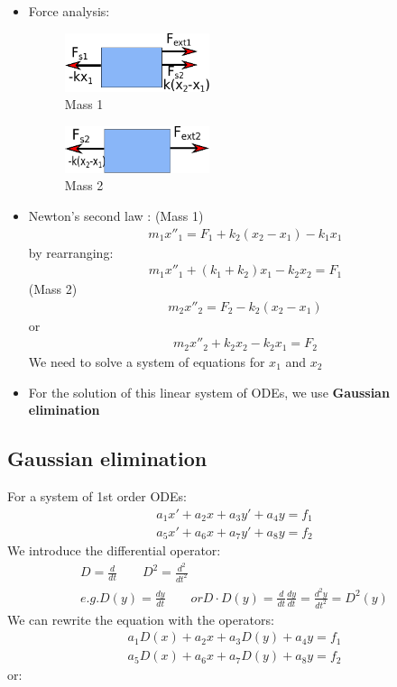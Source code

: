 \begin{itemize}
\item Force analysis:

\begin{figure}
\centering
\includegraphics[width=0.4\textwidth]{figs/massSpringDamperSystemCoupled_force1.pdf}
\caption{Mass 1}
\end{figure}
 \begin{figure}
\centering
\includegraphics[width=0.4\textwidth]{figs/massSpringDamperSystemCoupled_force2.pdf} 
\caption{Mass 2}
\end{figure}

\item Newton's second law :
(Mass 1)
 \begin{align*}
m_1x''_1  = F_1+k_2\left(x_2-x_1\right)-k_1x_1
\end{align*}
by rearranging:
 \begin{align*}
\boxed{m_1x''_1 +\left(k_1+k_2\right)x_1-k_2x_2 = F_1}
\end{align*}
(Mass 2)
 \begin{align*}
m_2x''_2  = F_2-k_2\left(x_2-x_1\right)
\end{align*}
or
\begin{align*}
\boxed{m_2x''_2 +k_2x_2- k_2x_1= F_2}
\end{align*}
We need to solve a system of equations for $x_1$ and $x_2$

\item For the solution of this linear system of ODEs, we use \textbf{Gaussian elimination}
\end{itemize}





\subsection{Gaussian elimination}
For a system of 1st order ODEs:
\begin{align*}
a_1x'+a_2x+a_3y'+a_4y=f_1\\
a_5x'+a_6x+a_7y'+a_8y=f_2
\end{align*}
We introduce the differential operator:
\begin{align*}
D=\frac{d}{dt}\qquad D^2=\frac{d^2}{dt^2}\\
e.g. D(y) = \frac{dy}{dt} \qquad or D \cdot D(y) = \frac{d}{dt}\frac{dy}{dt}=\frac{d^2y}{dt^2}=D^2(y)
\end{align*}
We can rewrite the equation with the operators:
\begin{align*}
a_1D(x)+a_2x+a_3D(y)+a_4y=f_1\\
a_5D(x)+a_6x+a_7D(y)+a_8y=f_2
\end{align*}
or:

